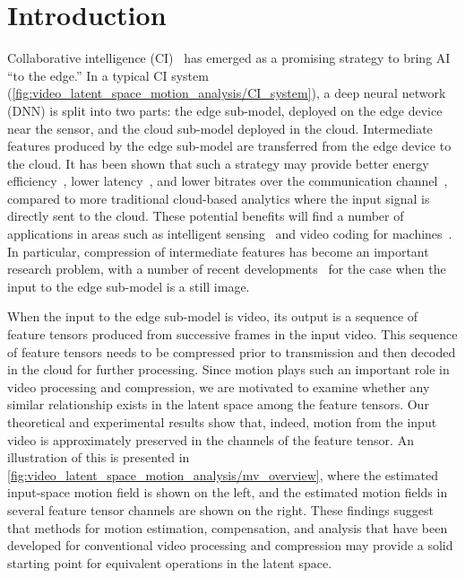 



\section{Introduction}

Collaborative intelligence (CI)~\cite{Bajic_etal_ICASSP21} has emerged as a promising strategy to bring AI ``to the edge.'' In a typical CI system (\cref{fig:video_latent_space_motion_analysis/CI_system}), a deep neural network (DNN) is split into two parts: the edge sub-model, deployed on the edge device near the sensor, and the cloud sub-model deployed in the cloud. Intermediate features produced by the edge sub-model are transferred from the edge device to the cloud. It has been shown that such a strategy may provide better energy efficiency~\cite{kang2017neurosurgeon,jointdnn}, lower latency~\cite{kang2017neurosurgeon,jointdnn,ulhaq2019neurips_demo}, and lower bitrates over the communication channel~\cite{dfc_for_collab_object_detection,choi2018mmsp}, compared to more traditional cloud-based analytics where the input signal is directly sent to the cloud. These potential benefits will find a number of applications in areas such as intelligent sensing~\cite{Chen19} and video coding for machines~\cite{MPEG_VCM_CFE,duan2020vcm}. In particular, compression of intermediate features has become an important research problem, with a number of recent developments~\cite{Saeed_ICIP19,Hyomin_ICASSP20,Saeed_ICASSP20,Bob_ICME20, Saeed2020pareto_arxiv} for the case when the input to the edge sub-model is a still image.

When the input to the edge sub-model is video, its output is a sequence of feature tensors produced from successive frames in the input video. This sequence of feature tensors needs to be compressed prior to transmission and then decoded in the cloud for further processing. Since motion plays such an important role in video processing and compression, we are motivated to examine whether any similar relationship exists in the latent space among the feature tensors. Our theoretical and experimental results show that, indeed, motion from the input video is approximately preserved in the channels of the feature tensor. %
An illustration of this is presented in \cref{fig:video_latent_space_motion_analysis/mv_overview}, where the estimated input-space motion field is shown on the left, and the estimated motion fields in several feature tensor channels are shown on the right.
These findings suggest that methods for motion estimation, compensation, and analysis that have been developed for conventional video processing and compression may provide a solid starting point for equivalent operations in the latent space.

